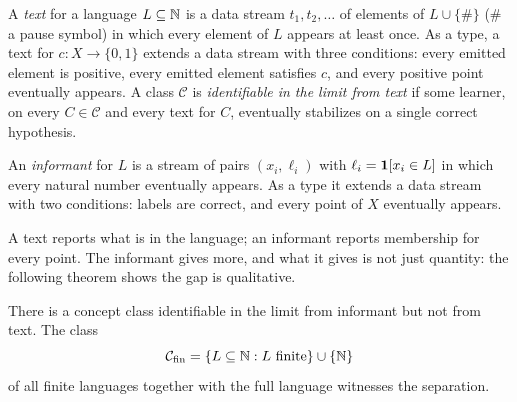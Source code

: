 \begin{defn}
\label{def:text}
A \emph{text} for a language $L \subseteq \mathbb{N}$ is a data stream $t_1, t_2, \ldots$ of elements of $L \cup \{\#\}$ ($\#$ a pause symbol) in which every element of $L$ appears at least once. As a type, a text for $c : X \to \{0,1\}$ extends a data stream with three conditions: every emitted element is positive, every emitted element satisfies $c$, and every positive point eventually appears. A class $\mathcal{C}$ is \emph{identifiable in the limit from text} if some learner, on every $C \in \mathcal{C}$ and every text for $C$, eventually stabilizes on a single correct hypothesis.
\end{defn}

\begin{defn}
\label{def:informant}
An \emph{informant} for $L$ is a stream of pairs $(x_i, \ell_i)$ with $\ell_i = \mathbf{1}[x_i \in L]$ in which every natural number eventually appears. As a type it extends a data stream with two conditions: labels are correct, and every point of $X$ eventually appears.
\end{defn}

A text reports what is in the language; an informant reports membership for every point. The informant gives more, and what it gives is not just quantity: the following theorem shows the gap is qualitative.

\begin{thm}
\label{thm:text-informant}
There is a concept class identifiable in the limit from informant but not from text. The class
\[
\mathcal{C}_{\mathrm{fin}} = \{L \subseteq \mathbb{N} : L \text{ finite}\} \cup \{\mathbb{N}\}
\]
of all finite languages together with the full language witnesses the separation.
\end{thm}

